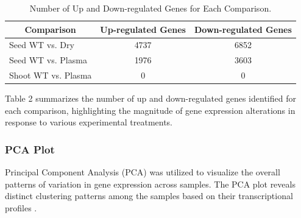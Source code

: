 \documentclass[12pt,letterpaper]{article}
\begin{document}
\begin{table}[H]
\centering
\begin{tabular}{|l|c|c|}
\hline
\multicolumn{1}{|c|}{\textbf{Comparison}} & \textbf{Up-regulated Genes} & \textbf{Down-regulated Genes} \\ \hline
Seed WT vs. Dry                           & 4737                                  & 6852                                    \\ \hline
Seed WT vs. Plasma                        & 1976                                  & 3603                                    \\ \hline
Shoot WT vs. Plasma                       & 0                                     & 0                                       \\ \hline
\end{tabular}
\caption{Number of Up and Down-regulated Genes for Each Comparison.}
\end{table}

Table 2 summarizes the number of up and down-regulated genes identified for each comparison, highlighting the magnitude of gene expression alterations in response to various experimental treatments.

\subsubsection{PCA Plot}
Principal Component Analysis (PCA) was utilized to visualize the overall patterns of variation in gene expression across samples. The PCA plot reveals distinct clustering patterns among the samples based on their transcriptional profiles \parencite{pearson1901pca}.
\end{document}
